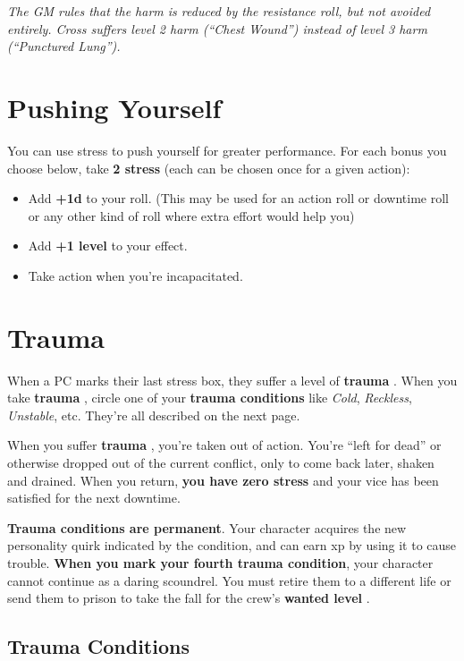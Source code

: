 \documentclass[11pt,fleqn,a5paper]{book}
\newcommand{\gameterm}[1]{\textbf{#1}}
\begin{document}
\emph{The GM rules that the harm is reduced by the resistance roll, but not avoided entirely. Cross suffers level 2 harm (“Chest Wound”) instead of level 3 harm (“Punctured Lung”).}

\section{Pushing Yourself}

You can use stress to push yourself for greater performance. For each bonus you choose below, take \textbf{2 stress} (each can be chosen once for a given action):

\begin{itemize}
	\item Add \textbf{+1d} to your roll. (This may be used for an action roll or downtime roll or any other kind of roll where extra effort would help you)
	\item Add \textbf{+1 level} to your effect.
	\item Take action when you’re incapacitated.
\end{itemize}

\section{Trauma}

When a PC marks their last stress box, they suffer a level of \gameterm{trauma} . When you take \gameterm{trauma} , circle one of your \textbf{trauma conditions} like \emph{Cold}, \emph{Reckless}, \emph{Unstable}, etc. They’re all described on the next page.

When you suffer \gameterm{trauma} , you’re taken out of action. You’re “left for dead” or otherwise dropped out of the current conflict, only to come back later, shaken and drained. When you return, \textbf{you have zero stress} and your vice has been satisfied for the next downtime.

\textbf{Trauma conditions are permanent}. Your character acquires the new personality quirk indicated by the condition, and can earn xp by using it to cause trouble. \textbf{When you mark your fourth trauma condition}, your character cannot continue as a daring scoundrel. You must retire them to a different life or send them to prison to take the fall for the crew’s \gameterm{wanted level} .

\subsection{Trauma Conditions}
\end{document}
